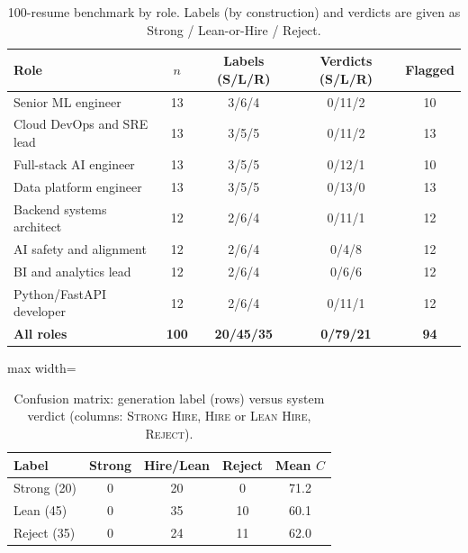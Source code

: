\documentclass[conference]{IEEEtran}
\newcommand{\verd}[1]{\textsc{#1}}
\newcommand{\Sstrong}{\verd{Strong Hire}}
\newcommand{\Shire}{\verd{Hire}}
\newcommand{\Slean}{\verd{Lean Hire}}
\newcommand{\Sreject}{\verd{Reject}}
\begin{document}
\begin{table}[t]
\caption{100-resume benchmark by role. Labels (by construction) and verdicts are given as Strong / Lean-or-Hire / Reject.}
\label{tab:bench}
\centering
\footnotesize
\renewcommand{\arraystretch}{1.05}
\begin{tabular}{@{}lcccc@{}}
\toprule
Role & $n$ & Labels (S/L/R) & Verdicts (S/L/R) & Flagged \\
\midrule
Senior ML engineer        & 13  & 3/6/4   & 0/11/2 & 10 \\
Cloud DevOps and SRE lead & 13  & 3/5/5   & 0/11/2 & 13 \\
Full-stack AI engineer    & 13  & 3/5/5   & 0/12/1 & 10 \\
Data platform engineer    & 13  & 3/5/5   & 0/13/0 & 13 \\
Backend systems architect & 12  & 2/6/4   & 0/11/1 & 12 \\
AI safety and alignment   & 12  & 2/6/4   & 0/4/8  & 12 \\
BI and analytics lead     & 12  & 2/6/4   & 0/6/6  & 12 \\
Python/FastAPI developer  & 12  & 2/6/4   & 0/11/1 & 12 \\
\midrule
\textbf{All roles}        & \textbf{100} & \textbf{20/45/35} & \textbf{0/79/21} & \textbf{94} \\
\bottomrule
\end{tabular}
\end{table}

\begin{table}[t]
\caption{Confusion matrix: generation label (rows) versus system verdict (columns: \Sstrong, \Shire{} or \Slean, \Sreject).}
\label{tab:confusion}
\centering
\footnotesize
\begin{adjustbox}{max width=\columnwidth}
\begin{tabular}{@{}lccc|c@{}}
\toprule
Label & Strong & Hire/Lean & Reject & Mean $C$ \\
\midrule
Strong (20) & 0 & 20 & 0  & 71.2 \\
Lean (45)   & 0 & 35 & 10 & 60.1 \\
Reject (35) & 0 & 24 & 11 & 62.0 \\
\bottomrule
\end{tabular}
\end{adjustbox}
\end{table}
\end{document}
